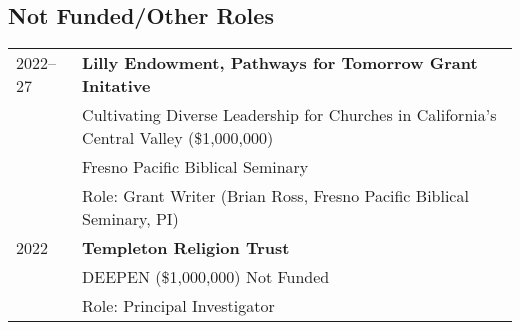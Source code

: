 \subsection*{Not Funded/Other Roles}
\begin{longtable}{p{} p{}}
2022--27 & \textbf{Lilly Endowment, Pathways for Tomorrow Grant Initative} \\
& Cultivating Diverse Leadership for Churches in California’s Central Valley (\$1,000,000)\\
& Fresno Pacific Biblical Seminary\\
& Role: Grant Writer (Brian Ross, Fresno Pacific Biblical Seminary, PI)\\
2022 & \textbf{Templeton Religion Trust} \\
& DEEPEN (\$1,000,000) Not Funded \\
& Role: Principal Investigator\\
\end{longtable}